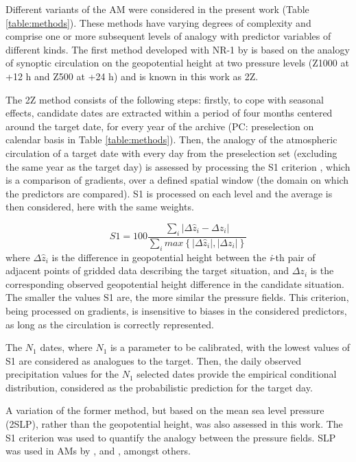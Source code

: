 \documentclass{ametsoc}
\begin{document}
	Different variants of the AM were considered in the present work (Table \ref{table:methods}). These methods have varying degrees of complexity and comprise one or more subsequent levels of analogy with predictor variables of different kinds. The first method developed with NR-1 by \citet{Bontron2004} is based on the analogy of synoptic circulation on the geopotential height at two pressure levels (Z1000 at +12 h and Z500 at +24 h) and is known in this work as 2Z.
	
	The 2Z method consists of the following steps: firstly, to cope with seasonal effects, candidate dates are extracted within a period of four months centered around the target date, for every year of the archive (PC: preselection on calendar basis in Table \ref{table:methods}). Then, the analogy of the atmospheric circulation of a target date with every day from the preselection set (excluding the same year as the target day) is assessed by processing the S1 criterion \citep[Eq.\ \ref{eq:S1}, ][]{Teweles1954, Drosdowsky2003}, which is a comparison of gradients, over a defined spatial window (the domain on which the predictors are compared). S1 is processed on each level and the average is then considered, here with the same weights.
	
	\begin{equation}
	\label{eq:S1}
	S1=100 \frac {\displaystyle \sum_{i} \vert \Delta\hat{z}_{i} - \Delta z_{i} \vert}
	{\displaystyle \sum_{i} max\left\lbrace \vert \Delta\hat{z}_{i} \vert , \vert \Delta z_{i} \vert \right\rbrace }
	\end{equation}
	where $\Delta \hat{z}_{i}$ is the difference in geopotential height between the \textit{i}-th pair of adjacent points of gridded data describing the target situation, and $\Delta z_{i}$ is the corresponding observed geopotential height difference in the candidate situation. The smaller the values S1 are, the more similar the pressure fields. This criterion, being processed on gradients, is insensitive to biases in the considered predictors, as long as the circulation is correctly represented.
	
	The $N_{1}$ dates, where $N_{1}$ is a parameter to be calibrated, with the lowest values of S1 are considered as analogues to the target. Then, the daily observed precipitation values for the $N_{1}$ selected dates provide the empirical conditional distribution, considered as the probabilistic prediction for the target day.
	
	A variation of the former method, but based on the mean sea level pressure (2SLP), rather than the geopotential height, was also assessed in this work. The S1 criterion was used to quantify the analogy between the pressure fields. SLP was used in AMs by \citet{Zorita1999}, \citet{Timbal2001a} and \citet{Martin2014b}, amongst others.
	
\end{document}
